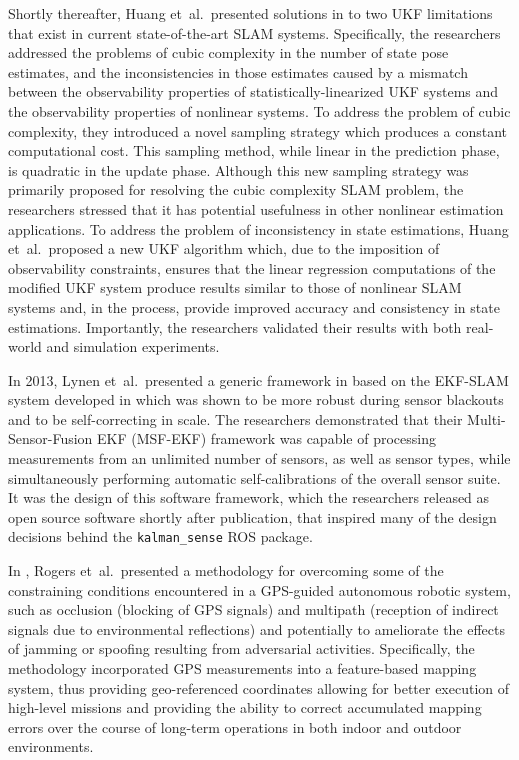 Shortly thereafter, Huang et~al.\ presented solutions in \cite{Huang2013} to two UKF limitations that exist in current state-of-the-art SLAM systems. Specifically, the researchers addressed the problems of cubic complexity in the number of state pose estimates, and the inconsistencies in those estimates caused by a mismatch between the observability properties of statistically-linearized UKF systems and the observability properties of nonlinear systems. To address the problem of cubic complexity, they introduced a novel sampling strategy which produces a constant computational cost. This sampling method, while linear in the prediction phase, is quadratic in the update phase. Although this new sampling strategy was primarily proposed for resolving the cubic complexity SLAM problem, the researchers stressed that it has potential usefulness in other nonlinear estimation applications. To address the problem of inconsistency in state estimations, Huang et~al.\ proposed a new UKF algorithm which, due to the imposition of observability constraints, ensures that the linear regression computations of the modified UKF system produce results similar to those of nonlinear SLAM systems and, in the process, provide improved accuracy and consistency in state estimations. Importantly, the researchers validated their results with both real-world and simulation experiments.

In 2013, Lynen et~al.\ presented a generic framework in \cite{Lynen2013} based on the EKF-SLAM system developed in \cite{Weiss2012} which was shown to be more robust during sensor blackouts and to be self-correcting in scale. The researchers demonstrated that their Multi-Sensor-Fusion EKF (MSF-EKF) framework was capable of processing measurements from an unlimited number of sensors, as well as sensor types, while simultaneously performing automatic self-calibrations of the overall sensor suite. It was the design of this software framework, which the researchers released as open source software shortly after publication, that inspired many of the design decisions behind the \texttt{kalman\_sense} ROS package.

In \cite{Rogers2014}, Rogers et~al.\ presented a methodology for overcoming some of the constraining conditions encountered in a GPS-guided autonomous robotic system, such as occlusion (blocking of GPS signals) and multipath (reception of indirect signals due to environmental reflections) and potentially to ameliorate the effects of jamming or spoofing resulting from adversarial activities. Specifically, the methodology incorporated GPS measurements into a feature-based mapping system, thus providing geo-referenced coordinates allowing for better execution of high-level missions and providing the ability to correct accumulated mapping errors over the course of long-term operations in both indoor and outdoor environments.

